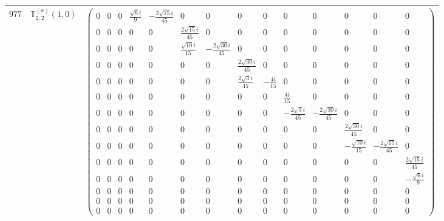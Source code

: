 \documentclass[fleqn,8pt,landscape]{jsarticle}
\begin{document}
\begin{center}
\begin{longtable}{ccc}
$ 977 $ & $ \mathbb{T}_{2,2}^{(a)}(1,0) $ & $ \begin{pmatrix} 0 & 0 & 0 & \frac{\sqrt{6} i}{9} & - \frac{2 \sqrt{15} i}{45} & 0 & 0 & 0 & 0 & 0 & 0 & 0 & 0 & 0 \\ 0 & 0 & 0 & 0 & 0 & \frac{2 \sqrt{15} i}{45} & 0 & 0 & 0 & 0 & 0 & 0 & 0 & 0 \\ 0 & 0 & 0 & 0 & 0 & \frac{\sqrt{10} i}{15} & - \frac{2 \sqrt{30} i}{45} & 0 & 0 & 0 & 0 & 0 & 0 & 0 \\ 0 & 0 & 0 & 0 & 0 & 0 & 0 & \frac{2 \sqrt{30} i}{45} & 0 & 0 & 0 & 0 & 0 & 0 \\ 0 & 0 & 0 & 0 & 0 & 0 & 0 & \frac{2 \sqrt{3} i}{45} & - \frac{4 i}{15} & 0 & 0 & 0 & 0 & 0 \\ 0 & 0 & 0 & 0 & 0 & 0 & 0 & 0 & 0 & \frac{4 i}{15} & 0 & 0 & 0 & 0 \\ 0 & 0 & 0 & 0 & 0 & 0 & 0 & 0 & 0 & - \frac{2 \sqrt{3} i}{45} & - \frac{2 \sqrt{30} i}{45} & 0 & 0 & 0 \\ 0 & 0 & 0 & 0 & 0 & 0 & 0 & 0 & 0 & 0 & 0 & \frac{2 \sqrt{30} i}{45} & 0 & 0 \\ 0 & 0 & 0 & 0 & 0 & 0 & 0 & 0 & 0 & 0 & 0 & - \frac{\sqrt{10} i}{15} & - \frac{2 \sqrt{15} i}{45} & 0 \\ 0 & 0 & 0 & 0 & 0 & 0 & 0 & 0 & 0 & 0 & 0 & 0 & 0 & \frac{2 \sqrt{15} i}{45} \\ 0 & 0 & 0 & 0 & 0 & 0 & 0 & 0 & 0 & 0 & 0 & 0 & 0 & - \frac{\sqrt{6} i}{9} \\ 0 & 0 & 0 & 0 & 0 & 0 & 0 & 0 & 0 & 0 & 0 & 0 & 0 & 0 \\ 0 & 0 & 0 & 0 & 0 & 0 & 0 & 0 & 0 & 0 & 0 & 0 & 0 & 0 \\ 0 & 0 & 0 & 0 & 0 & 0 & 0 & 0 & 0 & 0 & 0 & 0 & 0 & 0 \end{pmatrix} $ \\ \hline

\end{longtable}
\end{center}
\end{document}
